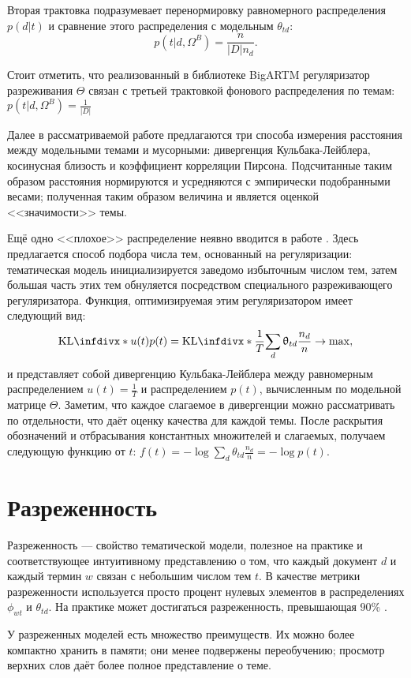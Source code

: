 Вторая трактовка подразумевает перенормировку равномерного распределения $p(d|t)$ и сравнение этого распределения с модельным $\theta_{td}$:
$$
    p(t|d, \Omega^B) = \frac{n}{|D| n_d}. 
$$

Стоит отметить, что реализованный в библиотеке BigARTM регуляризатор разреживания $\Theta$ связан с третьей трактовкой фонового распределения по темам: $p(t|d, \Omega^B) = \frac{1}{|D|} $

Далее в рассматриваемой работе предлагаются три способа измерения расстояния между модельными темами и мусорными: дивергенция Кульбака-Лейблера, косинусная близость и коэффициент корреляции Пирсона. Подсчитанные таким образом расстояния нормируются и усредняются с эмпирически подобранными весами; полученная таким образом величина и является оценкой <<значимости>> темы.

Ещё одно <<плохое>> распределение неявно вводится в работе \cite{plavin}. Здесь предлагается способ подбора числа тем, основанный на регуляризации: тематическая модель инициализируется заведомо избыточным числом тем, затем большая часть этих тем обнуляется посредством специального разреживающего регуляризатора. Функция, оптимизируемая этим регуляризатором имеет следующий вид:
\[
    \textup{KL}\infdiv*{u(t)}{p(t)} = \textup{KL}\infdiv*{\frac{1}{T}}{\sum_d \theta_{td} \frac{n_d}{n}} \rightarrow \max,
\]
и представляет собой дивергенцию Кульбака-Лейблера между равномерным распределением $u(t) = \frac{1}{T}$ и распределением $p(t)$, вычисленным по модельной матрице $\Theta$. Заметим, что каждое слагаемое в дивергенции можно рассматривать по отдельности, что даёт оценку качества для каждой темы. После раскрытия обозначений и отбрасывания константных множителей и слагаемых, получаем следующую функцию от $t$: 
$f(t) = - \log \sum_d \theta_{td} \frac{n_d}{n} = -\log p(t)$.

\section{Разреженность}

Разреженность --- свойство тематической модели, полезное на практике и соответствующее интуитивному представлению о том, что каждый документ $d$ и каждый термин $w$ связан с небольшим числом тем $t$. В качестве метрики разреженности используется просто процент нулевых элементов в распределениях $\phi_{wt}$ и $\theta_{td}$. На практике может достигаться разреженность, превышающая $90\%$ \cite{potapenko2013robust}.

У разреженных моделей есть множество преимуществ. Их можно более компактно хранить в памяти; они менее подвержены переобучению; просмотр верхних слов даёт более полное представление о теме.

